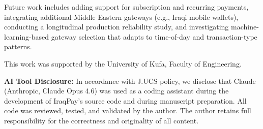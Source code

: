 \documentclass[10pt, a4paper, oneside]{article}
\begin{document}
Future work includes adding support for subscription and recurring payments, integrating additional Middle Eastern gateways (e.g., Iraqi mobile wallets), conducting a longitudinal production reliability study, and investigating machine-learning-based gateway selection that adapts to time-of-day and transaction-type patterns.

\begin{Acknowledgements}
This work was supported by the University of Kufa, Faculty of Engineering.

\textbf{AI Tool Disclosure:} In accordance with J.UCS policy, we disclose that Claude (Anthropic, Claude Opus 4.6) was used as a coding assistant during the development of IraqPay's source code and during manuscript preparation. All code was reviewed, tested, and validated by the author. The author retains full responsibility for the correctness and originality of all content.
\end{Acknowledgements}
\end{document}
